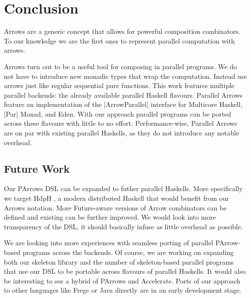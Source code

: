 
\section{Conclusion}
\label{sec:conclusion}
Arrows are a generic concept that allows for powerful composition combinators. To our knowledge we are the first ones to represent parallel computation with arrows. \done

Arrows turn out to be a useful tool for composing in parallel programs. We do not have to introduce new monadic types that wrap the computation. Instead use arrows just like regular sequential pure functions. 
%
This work features multiple parallel backends: the already available parallel Haskell flavours. Parallel Arrows feature an implementation of the |ArrowParallel| interface for Multicore Haskell, |Par| Monad, and Eden. With our approach parallel programs can be ported across these flavours with little to no effort.
%
%
Performance-wise, Parallel Arrows are on par with existing parallel Haskells, as they do not introduce any notable overhead.



\subsection{Future Work}
\label{sec:future-work}

Our PArrows DSL can be expanded to futher parallel Haskells. More specifically we target HdpH \cite{Maier:2014:HDS:2775050.2633363}, a modern distributed Haskell that would benefit from our Arrows notation. More Future-aware versions of Arrow combinators can be defined and existing can be further improved. We would look into more transparency of the DSL, it should basically infuse as little overhead as possible.

We are looking into more experiences with seamless porting of parallel PArrow-based programs across the backends.
Of course, we are working on expanding both our skeleton library and the number of skeleton-based parallel programs that use our DSL to be portable across flavours of parallel Haskells.
It would also be interesting to see a hybrid of PArrows and Accelerate.
Ports of our approach to other languages like Frege or Java directly are in an early development stage.
